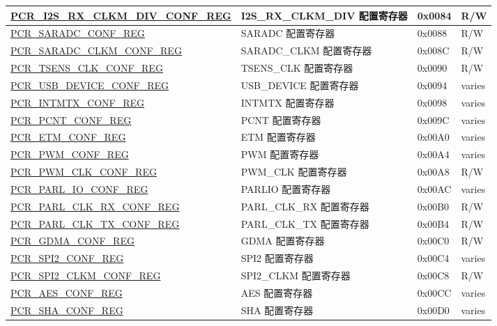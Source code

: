 \begin{longtable}{ | p{7.2cm} | p{6cm} | p{1.3cm} | p{1cm} | }
\hyperref[regdesc:PCRI2SRXCLKMDIVCONFREG]{PCR\_I2S\_RX\_CLKM\_DIV\_CONF\_REG} & I2S\_RX\_CLKM\_DIV 配置寄存器 & 0x0084 & R/W \\ \hline
\hyperref[regdesc:PCRSARADCCONFREG]{PCR\_SARADC\_CONF\_REG} & SARADC 配置寄存器 & 0x0088 & R/W \\ \hline
\hyperref[regdesc:PCRSARADCCLKMCONFREG]{PCR\_SARADC\_CLKM\_CONF\_REG} & SARADC\_CLKM 配置寄存器 & 0x008C & R/W \\ \hline
\hyperref[regdesc:PCRTSENSCLKCONFREG]{PCR\_TSENS\_CLK\_CONF\_REG} & TSENS\_CLK 配置寄存器 & 0x0090 & R/W \\ \hline
\hyperref[regdesc:PCRUSBDEVICECONFREG]{PCR\_USB\_DEVICE\_CONF\_REG} & USB\_DEVICE 配置寄存器 & 0x0094 & varies \\ \hline
\hyperref[regdesc:PCRINTMTXCONFREG]{PCR\_INTMTX\_CONF\_REG} & INTMTX 配置寄存器 & 0x0098 & varies \\ \hline
\hyperref[regdesc:PCRPCNTCONFREG]{PCR\_PCNT\_CONF\_REG} & PCNT 配置寄存器 & 0x009C & varies \\ \hline
\hyperref[regdesc:PCRETMCONFREG]{PCR\_ETM\_CONF\_REG} & ETM 配置寄存器 & 0x00A0 & varies \\ \hline
\hyperref[regdesc:PCRPWMCONFREG]{PCR\_PWM\_CONF\_REG} & PWM 配置寄存器 & 0x00A4 & varies \\ \hline
\hyperref[regdesc:PCRPWMCLKCONFREG]{PCR\_PWM\_CLK\_CONF\_REG} & PWM\_CLK 配置寄存器 & 0x00A8 & R/W \\ \hline
\hyperref[regdesc:PCRPARLIOCONFREG]{PCR\_PARL\_IO\_CONF\_REG} & PARLIO 配置寄存器 & 0x00AC & varies \\ \hline
\hyperref[regdesc:PCRPARLCLKRXCONFREG]{PCR\_PARL\_CLK\_RX\_CONF\_REG} & PARL\_CLK\_RX 配置寄存器 & 0x00B0 & R/W \\ \hline
\hyperref[regdesc:PCRPARLCLKTXCONFREG]{PCR\_PARL\_CLK\_TX\_CONF\_REG} & PARL\_CLK\_TX 配置寄存器 & 0x00B4 & R/W \\ \hline
\hyperref[regdesc:PCRGDMACONFREG]{PCR\_GDMA\_CONF\_REG} & GDMA 配置寄存器 & 0x00C0 & R/W \\ \hline
\hyperref[regdesc:PCRSPI2CONFREG]{PCR\_SPI2\_CONF\_REG} & SPI2 配置寄存器 & 0x00C4 & varies \\ \hline
\hyperref[regdesc:PCRSPI2CLKMCONFREG]{PCR\_SPI2\_CLKM\_CONF\_REG} & SPI2\_CLKM 配置寄存器 & 0x00C8 & R/W \\ \hline
\hyperref[regdesc:PCRAESCONFREG]{PCR\_AES\_CONF\_REG} & AES 配置寄存器 & 0x00CC & varies \\ \hline
\hyperref[regdesc:PCRSHACONFREG]{PCR\_SHA\_CONF\_REG} & SHA 配置寄存器 & 0x00D0 & varies \\ \hline

\end{longtable}

